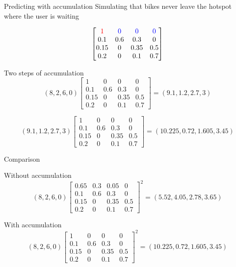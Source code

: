 \begin{frame}{Predicting with accumulation}
Simulating that bikes never leave the hotspot where the user is waiting

$$ \begin{bmatrix}
	{\color{red}1} & {\color{blue}0} & \color{blue} 0& {\color{blue}0}\\
	0.1  & 0.6 & 0.3  & 0\\
	0.15 & 0   & 0.35 & 0.5\\
	0.2  & 0   & 0.1  & 0.7
\end{bmatrix}
 $$
\end{frame}


\begin{frame}{Two steps of accumulation}
$$
(8, 2, 6, 0)
\begin{bmatrix}
1 & 0 & 0 & 0\\
0.1  & 0.6 & 0.3  & 0\\
0.15 & 0   & 0.35 & 0.5\\
0.2  & 0   & 0.1  & 0.7
\end{bmatrix}
=
(9.1,1.2,2.7,3)
$$
	
$$
(9.1,1.2,2.7,3)
\begin{bmatrix}
1 & 0 & 0 & 0\\
0.1  & 0.6 & 0.3  & 0\\
0.15 & 0   & 0.35 & 0.5\\
0.2  & 0   & 0.1  & 0.7
\end{bmatrix}
=
(10.225,0.72,1.605,3.45)
$$
	
\end{frame}

\begin{frame}{Comparison}
	
		Without accumulation
		$$
		(8,2,6,0)
		{\begin{bmatrix}
		0.65 & 0.3 & 0.05 & 0\\
		0.1  & 0.6 & 0.3  & 0\\
		0.15 & 0   & 0.35 & 0.5\\
		0.2  & 0   & 0.1  & 0.7
		\end{bmatrix}}^2
		=
		(5.52,4.05,2.78,3.65)
		$$
		
		With accumulation
$$
(8,2,6,0)
{\begin{bmatrix}
1 & 0 & 0 & 0\\
0.1  & 0.6 & 0.3  & 0\\
0.15 & 0   & 0.35 & 0.5\\
0.2  & 0   & 0.1  & 0.7
\end{bmatrix}}^2
=
(10.225,0.72,1.605,3.45)
$$
	
\end{frame}
